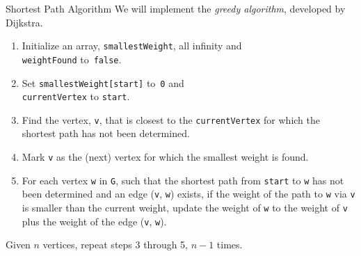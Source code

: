 \documentclass[14pt,aspectratio=1610]{beamer}
\begin{document}
\begin{frame}{Shortest Path Algorithm}
We will implement the \emph{greedy algorithm}, developed by Dijkstra.\vspace{-1.5em}
\begin{enumerate}\small
  \item
    Initialize an array, \lstinline{smallestWeight}, all infinity and\\
    \lstinline{weightFound} to~\lstinline{false}.
  \item
    Set \lstinline{smallestWeight[start]} to~\lstinline{0} and\\
    \lstinline{currentVertex} to \lstinline{start}.
  \item
    Find the vertex, \lstinline{v}, that is closest to the \lstinline{currentVertex} for which the shortest path has not been determined.
  \item
    Mark \lstinline{v} as the (next) vertex for which the smallest weight is found.
  \item
    For each vertex \lstinline{w} in \lstinline{G}, such that the shortest path from \lstinline{start} to \lstinline{w} has not been determined and an edge (\lstinline{v}, \lstinline{w}) exists, if the weight of the path to \lstinline{w} via \lstinline{v} is smaller than the current weight, update the weight of \lstinline{w} to the weight of \lstinline{v} plus the weight of the edge (\lstinline{v}, \lstinline{w}).
  \end{enumerate}
Given \(n\) vertices, repeat steps 3 through 5, \(n - 1\) times.
\end{frame}
\end{document}
